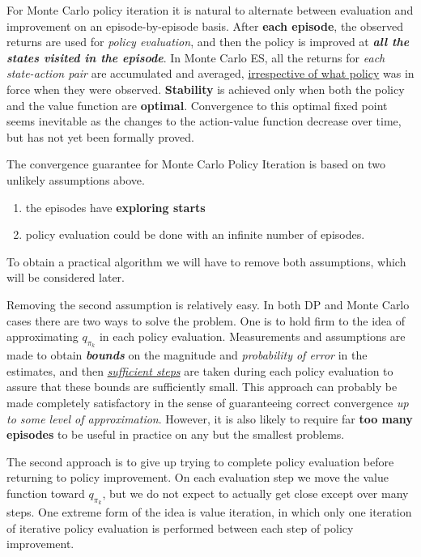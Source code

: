 \documentclass[11pt]{article}
\begin{document}
For Monte Carlo policy iteration it is natural to alternate between evaluation and improvement on an episode-by-episode basis. After \textbf{each episode}, the observed returns
are used for \emph{policy evaluation}, and then the policy is improved at \emph{\textbf{all the states visited in the episode}}.  In Monte Carlo ES, all the returns for \emph{each state-action pair} are accumulated and averaged, \underline{irrespective of what policy} was in force when they were observed. \textbf{Stability} is achieved only when both the policy and the value function are \textbf{optimal}. Convergence to this optimal fixed point seems inevitable as the changes to the action-value function decrease over time, but has not yet been formally proved.

The convergence guarantee for Monte Carlo Policy Iteration is based on two unlikely assumptions above. 
\begin{enumerate}
\item the episodes have \textbf{exploring starts}

\item policy evaluation could be done with an infinite number of episodes.
\end{enumerate} To obtain a practical algorithm we will have to remove both assumptions, which will be considered later. 

Removing the second assumption is relatively easy. In both DP and Monte Carlo cases there are two ways to solve the problem. One is to hold firm to the idea of approximating $q_{\pi_k}$ in each policy evaluation. Measurements and assumptions are made to obtain \emph{\textbf{bounds}} on the magnitude and \emph{probability of error} in the estimates, and then \underline{\emph{sufficient steps}} are taken during each policy evaluation to assure that these bounds are sufficiently small. This approach can probably be made completely satisfactory in the sense of guaranteeing correct convergence \emph{up to some level of approximation}. However, it is also likely to require far \textbf{too many episodes} to be useful in practice on any but the smallest problems.

The second approach is to give up trying to complete policy evaluation before returning to policy improvement. On each evaluation step we move the value function toward $q_{\pi_k}$, but we do not expect to actually get close except over many steps. One extreme form of the idea is value iteration, in which only one iteration of iterative policy evaluation is performed between each step of policy improvement.
\end{document}

